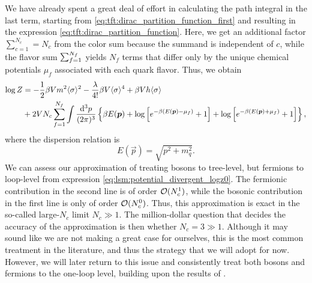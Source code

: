 We have already spent a great deal of effort in calculating the path integral in the last term,
starting from \cref{eq:tft:dirac_partition_function_first} and resulting in the expression \eqref{eq:tft:dirac_partition_function}.
Here, we get an additional factor $\sum_{c=1}^{N_c} = N_c$ from the color sum because the summand is independent of $c$,
while the flavor sum $\sum_{f=1}^{\smash{N_f}}$ yields $N_f$ terms that differ only by the unique chemical potentials $\mu_f$ associated with each quark flavor. 
Thus, we obtain
\begin{equation}
\begin{split}
	\log Z &= -\frac12 \beta V m^2 \langle \sigma \rangle^2 - \frac{\lambda}{4!} \beta V \langle \sigma \rangle^4 + \beta V h \langle \sigma \rangle \\
	       &+ 2 V N_c \sum_{f=1}^{N_f} \int \frac{\mathop{}\!\mathrm{d}^3 p}{(2 \pi)^3} \left\{ \beta E({\bm{p}}) + \log \left[ e^{-\beta (E({\bm{p}}) - \mu_f)}+1 \right] + \log \left[ e^{-\beta (E({\bm{p}}) + \mu_f)} + 1\right] \right\} ,
\end{split}
\label{eq:lsm:potential_divergent_logz0}
\end{equation}
where the dispersion relation is
\begin{equation}
	E(\vec{p}) = \sqrt{p^2 + m_q^2} .
\end{equation}
We can assess our approximation of treating bosons to tree-level, but fermions to loop-level from expression \eqref{eq:lsm:potential_divergent_logz0}.
The fermionic contribution in the second line is of order $\mathcal{O}(N_c^1)$, while the bosonic contribution in the first line is only of order $\mathcal{O}(N_c^0)$.
Thus, this approximation is exact in the so-called large-$N_c$ limit $N_c \gg 1$.
The million-dollar question that decides the accuracy of the approximation is then whether $N_c = 3 \gg 1$.
Although it may sound like we are not making a great case for ourselves, this is the most common treatment in the literature, and thus the strategy that we will adopt for now.
However, we will later return to this issue and consistently treat both bosons and fermions to the one-loop level, building upon the results of \cite{ref:jo_lsm_renormalization}.

